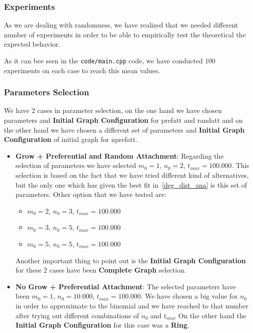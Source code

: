 \documentclass[12pt, a4paper]{article}
\begin{document}
\subsubsection{Experiments}
As we are dealing with randomness, we have realized that we needed different number of experiments in order to be able to empirically test the theoretical the expected behavior. 

As it can bee seen in the \texttt{code/main.cpp} code, we have conducted $100$ experiments on each case to reach this mean values.

\subsubsection{Parameters Selection}
We have 2 cases in parameter selection, on the one hand we have chosen parameters and \textbf{Initial Graph Configuration} for \acrshort{prefatt} and \acrfull{randatt} and on the other hand we have chosen a different set of parameters
and \textbf{Initial Graph Configuration} of initial graph for \acrshort{nprefatt}.

\begin{itemize}
    \item \textbf{Grow + Preferential and Random Attachment}: Regarding the selection of parameters we have selected $m_0 = 1$, $n_0 = 2$, $t_{max} = 100.000$.
    This selection is based on the fact that we have tried different kind of alternatives, but the only one which has given the best fit 
    in~\ref{deg_dist_ana} is this set of parameters.
    Other option that we have tested are:
    
    \begin{itemize}
        \item $m_0 = 2$, $n_0 = 3$, $t_{max} = 100.000$
        \item $m_0 = 3$, $n_0 = 5$, $t_{max} = 100.000$
        \item $m_0 = 5$, $n_0 = 5$, $t_{max} = 100.000$
    \end{itemize}

    Another important thing to point out is the \textbf{Initial Graph Configuration} for these 2 cases have been \textbf{Complete Graph} selection.
    
    \item \textbf{No Grow + Preferential Attachment}: The selected parameters have been $m_0 = 1$, $n_0= 10.000$, $t_{max} = 100.000$. 
    We have chosen a big value for $n_0$ in order to approximate to the binomial and we have reached to that number after trying out different combinations of $n_0$ and $t_{max}$
    On the other hand the \textbf{Initial Graph Configuration} for this case was a \textbf{Ring}.
    
\end{itemize}
\end{document}
